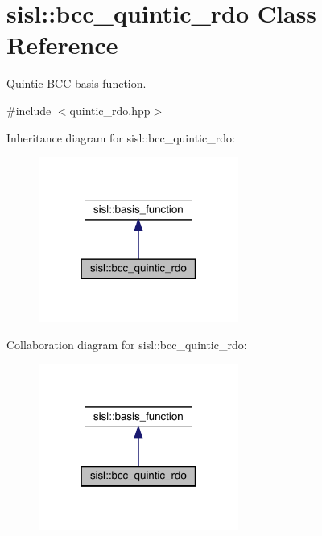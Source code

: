 \hypertarget{classsisl_1_1bcc__quintic__rdo}{}\section{sisl\+:\+:bcc\+\_\+quintic\+\_\+rdo Class Reference}
\label{classsisl_1_1bcc__quintic__rdo}


Quintic B\+CC basis function.  




{\ttfamily \#include $<$quintic\+\_\+rdo.\+hpp$>$}



Inheritance diagram for sisl\+:\+:bcc\+\_\+quintic\+\_\+rdo\+:\nopagebreak
\begin{figure}[H]
\begin{center}
\leavevmode
\includegraphics[width=186pt]{classsisl_1_1bcc__quintic__rdo__inherit__graph}
\end{center}
\end{figure}


Collaboration diagram for sisl\+:\+:bcc\+\_\+quintic\+\_\+rdo\+:\nopagebreak
\begin{figure}[H]
\begin{center}
\leavevmode
\includegraphics[width=186pt]{classsisl_1_1bcc__quintic__rdo__coll__graph}
\end{center}
\end{figure}
